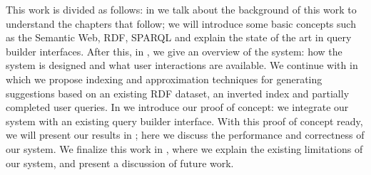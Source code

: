 This work is divided as follows: in  we talk about the background of this work to understand the chapters that follow; we will introduce some basic concepts such as the Semantic Web, RDF, SPARQL and explain the state of the art in query builder interfaces. After this, in , we give an overview of the system: how the system is designed and what user interactions are available. We continue with  in which we propose indexing and approximation techniques for generating suggestions based on an existing RDF dataset, an inverted index and partially completed user queries. In  we introduce our proof of concept: we integrate our system with an existing query builder interface. With this proof of concept ready, we will present our results in ; here we discuss the performance and correctness of our system. We finalize this work in , where we explain the existing limitations of our system, and present a discussion of future work.